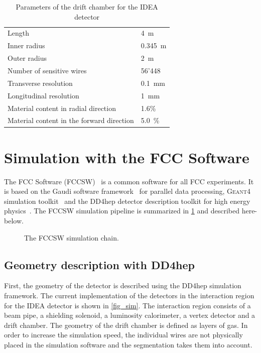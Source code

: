 \documentclass[conference]{IEEEtran}
\begin{document}
\begin{table}[!t]
	\renewcommand{\arraystretch}{1.3}
	\caption{Parameters of the drift chamber for the IDEA detector}
	\label{driftChamberParams}
	\centering
	\begin{tabular}{l l}
		\toprule
			Length & 4~m \\
      Inner radius & 0.345~m \\
      Outer radius & 2~m\\
      Number of sensitive wires & 56'448 \\
      Transverse resolution & 0.1~mm \\
			Longitudinal resolution & 1~mm \\
			Material content in radial direction & 1.6\% \\
			Material content in the forward direction & 5.0~\% \\
		\bottomrule
	\end{tabular}
\end{table}

\section{Simulation with the FCC Software}

The FCC Software (FCCSW)~\cite{FCCSW} is a common software for all FCC experiments. It is based on the Gaudi software framework~\cite{Gaudi} for parallel data processing, \textsc{Geant4} simulation toolkit~\cite{Geant4} and the DD4hep detector description toolkit for high energy physics~\cite{DD4hep}. The FCCSW simulation pipeline is summarized in \cref{simu_chain} and described here-below.

\begin{figure}[!h]
\centering
\caption{The FCCSW simulation chain.}
\label{simu_chain}
\end{figure}




\subsection{Geometry description with DD4hep}
First, the geometry of the detector is described using the DD4hep simulation framework. The current implementation of the detectors in the interaction region for the IDEA detector is shown in \cref{fig_sim}. The interaction region consists of a beam pipe, a shielding solenoid, a luminosity calorimeter, a vertex detector and a drift chamber. The geometry of the drift chamber is defined as layers of gas. In order to increase the simulation speed, the individual wires are not physically placed in the simulation software and the segmentation takes them into account.
\end{document}
